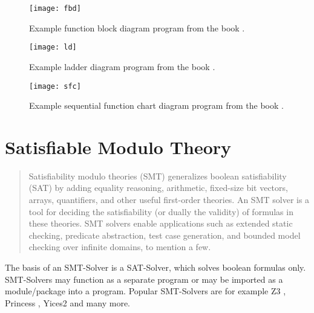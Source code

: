 \begin{figure}
	\centering
	\texttt{[image: fbd]}
	\caption{Example function block diagram program from the book \cite{johnIEC611313Programming2010}.}
	\label{code:fbd}
\end{figure}

\begin{figure}
	\centering
	\texttt{[image: ld]}
	\caption{Example ladder diagram program from the book \cite{johnIEC611313Programming2010}.}
	\label{code:ld}
\end{figure}

\begin{figure}
	\centering
	\texttt{[image: sfc]}
	\caption{Example sequential function chart diagram program from the book \cite{johnIEC611313Programming2010}.}
	\label{code:sfc}
\end{figure}

\section{Satisfiable Modulo Theory}
\begin{quote}
	Satisfiability modulo theories (SMT) generalizes boolean satisfiability (SAT) by
	adding equality reasoning, arithmetic, fixed-size bit vectors, arrays, quantifiers,
	and other useful first-order theories. An SMT solver is a tool for deciding the satisfiability (or dually the validity) of formulas in these theories. SMT solvers enable
	applications such as extended static checking, predicate abstraction, test case generation, and bounded model checking over infinite domains, to mention a few. \cite{demouraZ3EfficientSMT2008}
\end{quote}

The basis of an SMT-Solver is a SAT-Solver, which solves boolean formulas only. SMT-Solvers may function as a separate program or may be imported as a module/package into a program. 
Popular SMT-Solvers are for example Z3 \cite{demouraZ3EfficientSMT2008}, Princess \cite{princess08}, Yices2 \cite{Dutertre:cav2014} and many more.

